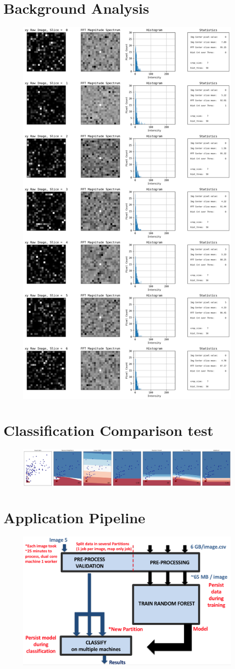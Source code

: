 \documentclass{neu_handout}
\begin{document}
\section{Background Analysis}
\begin{figure}[!h]
  \includegraphics[width=0.65\linewidth]{background-xy-0}
  \label{fig:background-xy-0}
\end{figure}

\newpage

\section{Classification Comparison test}
\begin{figure}[!h]
  \includegraphics[width=1\linewidth]{classification-test}
  \label{fig:classification-test}
\end{figure}

\section{Application Pipeline}
\begin{figure}[!h]
  \includegraphics[width=0.7\linewidth]{pipeline}
  \label{fig:pipeline}
\end{figure}
\end{document}

